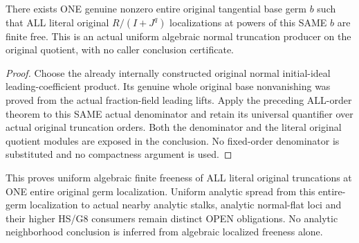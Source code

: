 \begin{theorem}
\label{hir:relative-normal-uniformtrunc-original-uniform-consumer}
\leanok
{}
There exists ONE genuine nonzero entire original tangential base germ $b$
such that ALL literal original $R/(I+J^q)$ localizations at powers of this
SAME $b$ are finite free. This is an actual uniform algebraic normal
truncation producer on the original quotient, with no caller conclusion certificate.
\end{theorem}
\begin{proof}
Choose the already internally constructed original normal initial-ideal
leading-coefficient product. Its genuine whole original base nonvanishing
was proved from the actual fraction-field leading lifts. Apply the
preceding ALL-order theorem to this SAME actual denominator and retain
its universal quantifier over actual original truncation orders. Both
the denominator and the literal original quotient modules are exposed in
the conclusion. No fixed-order denominator is substituted and no compactness
argument is used.
\end{proof}

\begin{remark}
This proves uniform algebraic finite freeness of ALL literal original
truncations at ONE entire original germ localization. Uniform analytic
spread from this entire-germ localization to actual nearby analytic stalks,
analytic normal-flat loci and their higher HS/G8 consumers remain distinct
OPEN obligations. No analytic neighborhood conclusion is inferred from
algebraic localized freeness alone.
\end{remark}
